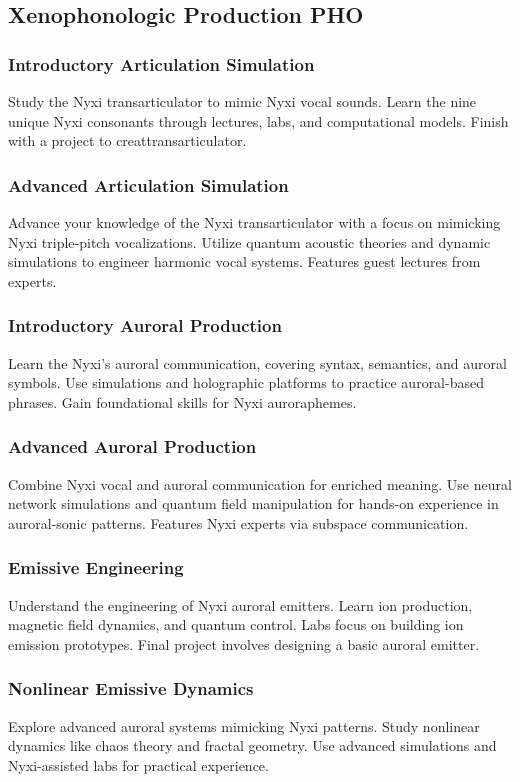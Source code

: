 \subsection{Xenophonologic Production \hfill PHO}
\subsubsection{Introductory Articulation Simulation}
Study the Nyxi transarticulator to mimic Nyxi vocal sounds. Learn the nine unique Nyxi consonants through lectures, labs, and computational models. Finish with a project to creattransarticulator.
\subsubsection{Advanced Articulation Simulation}
Advance your knowledge of the Nyxi transarticulator with a focus on mimicking Nyxi triple-pitch vocalizations. Utilize quantum acoustic theories and dynamic simulations to engineer harmonic vocal systems. Features guest lectures from experts.
\subsubsection{Introductory Auroral Production}
Learn the Nyxi's auroral communication, covering syntax, semantics, and auroral symbols. Use simulations and holographic platforms to practice auroral-based phrases. Gain foundational skills for Nyxi auroraphemes.
\subsubsection{Advanced Auroral Production}
Combine Nyxi vocal and auroral communication for enriched meaning. Use neural network simulations and quantum field manipulation for hands-on experience in auroral-sonic patterns. Features Nyxi experts via subspace communication.
\subsubsection{Emissive Engineering}
Understand the engineering of Nyxi auroral emitters. Learn ion production, magnetic field dynamics, and quantum control. Labs focus on building ion emission prototypes. Final project involves designing a basic auroral emitter.
\subsubsection{Nonlinear Emissive Dynamics}
Explore advanced auroral systems mimicking Nyxi patterns. Study nonlinear dynamics like chaos theory and fractal geometry. Use advanced simulations and Nyxi-assisted labs for practical experience.
